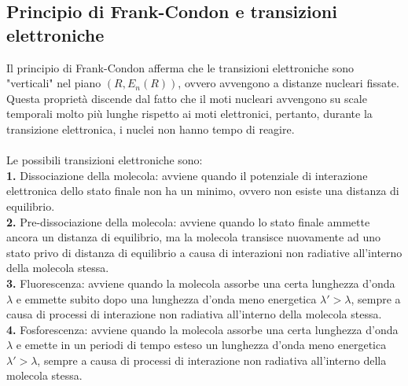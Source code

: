 \documentclass{article}
\begin{document}
\newpage
\subsection{Principio di Frank-Condon e transizioni elettroniche}
Il principio di Frank-Condon afferma che le transizioni elettroniche sono "verticali" nel piano $(R, E_n(R))$, ovvero avvengono a distanze nucleari fissate. Questa proprietà discende dal fatto che il moti nucleari avvengono su scale temporali molto più lunghe rispetto ai moti elettronici, pertanto, durante la transizione elettronica, i nuclei non hanno tempo di reagire. \\ \\
Le possibili transizioni elettroniche sono: \\

\textbf{1.} Dissociazione della molecola: avviene quando il potenziale di interazione elettronica dello stato finale non ha un minimo, ovvero non esiste una distanza di equilibrio. \\

\textbf{2.} Pre-dissociazione della molecola: avviene quando lo stato finale ammette ancora un distanza di equilibrio, ma la molecola transisce nuovamente ad uno stato privo di distanza di equilibrio a causa di interazioni non radiative all'interno della molecola stessa. \\

\textbf{3.} Fluorescenza: avviene quando la molecola assorbe una certa lunghezza d'onda $\lambda$ e emmette subito dopo una lunghezza d'onda meno energetica $\lambda' > \lambda$, sempre a causa di processi di interazione non radiativa all'interno della molecola stessa. \\

\textbf{4.} Fosforescenza: avviene quando la molecola assorbe una certa lunghezza d'onda $\lambda$ e emette in un periodi di tempo esteso un lunghezza d'onda meno energetica $\lambda' > \lambda$, sempre a causa di processi di interazione non radiativa all'interno della molecola stessa. 

\newpage
\end{document}
